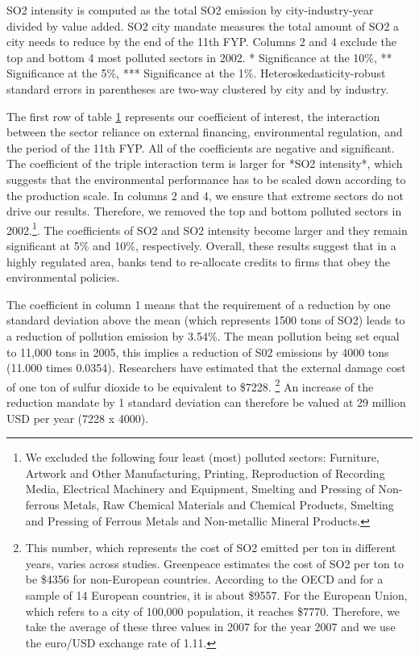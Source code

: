 \documentclass[12pt]{article}
\begin{document}
\begin{table}[htbp]
{\begin{threeparttable}
\begin{tabular}{l*{4}{c}}
\bottomrule
  \end{tabular}
  \begin{tablenotes}
      \small
      \item SO2 intensity is computed as the total SO2 emission by city-industry-year divided by value added. SO2 city mandate measures the total amount of SO2 a city needs to reduce by the end of the 11th FYP. Columns 2 and 4 exclude the top and bottom 4 most polluted sectors in 2002.
 * Significance at the 10\%, ** Significance at the 5\%, *** Significance at the 1\%. Heteroskedasticity-robust standard errors in parentheses are two-way clustered by city and by industry.
    \end{tablenotes}
    \label{tab:table2}
\end{threeparttable}}
\end{table}

The first row of table \ref{tab:table2} represents our coefficient of interest, the interaction between the sector reliance on external financing, environmental regulation, and the period of the 11th FYP. All of the coefficients are negative and significant. The coefficient of the triple interaction term is larger for *SO2 intensity*, which suggests that the environmental performance has to be scaled down according to the production scale. In columns 2 and 4, we ensure that extreme sectors do not drive our results. Therefore, we removed the top and bottom polluted sectors in 2002.\footnote{We excluded the following four least (most) polluted sectors: Furniture, Artwork and Other Manufacturing, Printing, Reproduction of Recording Media, Electrical Machinery and Equipment, Smelting and Pressing of Non-ferrous Metals, Raw Chemical Materials and Chemical Products, Smelting and Pressing of Ferrous Metals and  Non-metallic Mineral Products.}. The coefficients of SO2 and SO2 intensity become larger and they remain significant at 5\% and 10\%, respectively. Overall, these results suggest that in a highly regulated area, banks tend to re-allocate credits to firms that obey the environmental policies.

The coefficient in column 1 means that the requirement of a  reduction by one standard deviation above the mean (which represents 1500 tons of SO2) leads to a reduction of pollution emission by 3.54\%. The mean pollution being set equal to 11,000 tons in 2005, this implies a reduction of S02 emissions by 4000 tons (11.000 times 0.0354). Researchers have estimated that the external damage cost of one ton of sulfur dioxide to be equivalent to \$7228. \footnote{This number, which represents the cost of SO2 emitted per ton in different years, varies across studies. Greenpeace estimates the cost of SO2 per ton to be \$4356 for non-European countries. According to the OECD and for a sample of  14 European countries, it is about \$9557. For the European Union, which refers to a city of 100,000 population, it reaches \$7770. Therefore, we take the average of these three values in 2007 for the year  2007 and we use the euro/USD exchange rate of 1.11. } An increase of the reduction mandate by 1 standard deviation can therefore be valued at 29 million USD per year (7228 x 4000).  
\end{document}
